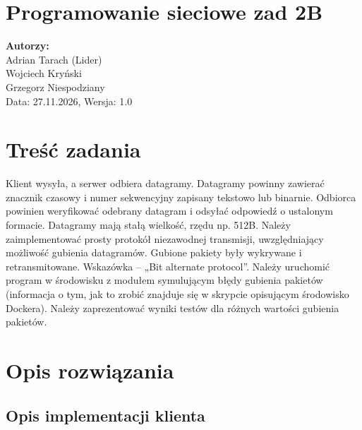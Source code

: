 \documentclass[12pt,a4paper]{article}
\begin{document}
\section*{Programowanie sieciowe zad 2B}

\textbf{Autorzy:} \\
Adrian Tarach (Lider) \\
Wojciech Kryński\\
Grzegorz Niespodziany \\
Data: 27.11.2026, Wersja: 1.0

\section*{Treść zadania}

Klient wysyła, a serwer odbiera datagramy. Datagramy powinny zawierać znacznik czasowy i numer sekwencyjny
zapisany tekstowo lub binarnie. Odbiorca powinien weryfikować odebrany datagram i odsyłać odpowiedź o ustalonym
formacie. Datagramy mają stałą wielkość, rzędu np. 512B. Należy zaimplementować prosty protokół niezawodnej
transmisji, uwzględniający możliwość gubienia datagramów. Gubione pakiety były wykrywane i retransmitowane.
Wskazówka – „Bit alternate protocol”. Należy uruchomić program w środowisku z modułem symulującym błędy
gubienia pakietów (informacja o tym, jak to zrobić znajduje się w skrypcie opisującym środowisko Dockera). Należy
zaprezentować wyniki testów dla różnych wartości gubienia pakietów.

\section*{Opis rozwiązania}

\subsection*{Opis implementacji klienta}
\end{document}

